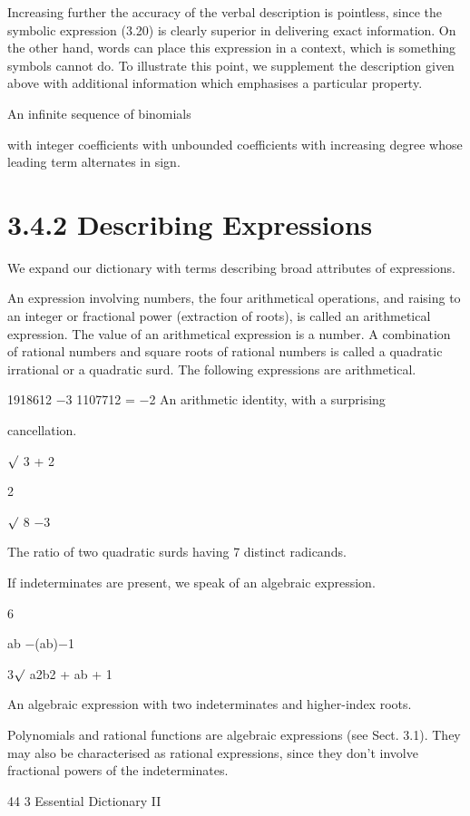 \documentclass[11pt]{article}
\theoremstyle{plain}
\theoremstyle{definition}
\begin{document}
Increasing further the accuracy of the verbal description is pointless, since the symbolic expression (3.20) is clearly superior in delivering exact information. On the other hand, words can place this expression in a context, which is something symbols cannot do. To illustrate this point, we supplement the description given above with additional information which emphasises a particular property.

An infinite sequence of binomials

with integer coefficients with unbounded coefficients with increasing degree whose leading term alternates in sign.

\section{3.4.2 Describing Expressions}

We expand our dictionary with terms describing broad attributes of expressions.

An expression involving numbers, the four arithmetical operations, and raising to an integer or fractional power (extraction of roots), is called an arithmetical expression. The value of an arithmetical expression is a number. A combination of rational numbers and square roots of rational numbers is called a quadratic irrational or a quadratic surd. The following expressions are arithmetical.

1918612 $-$3 \textperiodcentered{} 1107712 = $-$2 An arithmetic identity, with a surprising

cancellation.

$\surd$ 3 + 2

2

$\surd$ 8 $-$3

The ratio of two quadratic surds having 7 distinct radicands.

If indeterminates are present, we speak of an algebraic expression.

6

ab $-$(ab)$-$1

3$\surd$ a2b2 + ab + 1

An algebraic expression with two indeterminates and higher-index roots.

Polynomials and rational functions are algebraic expressions (see Sect. 3.1). They may also be characterised as rational expressions, since they don't involve fractional powers of the indeterminates.

44 3 Essential Dictionary II
\end{document}
